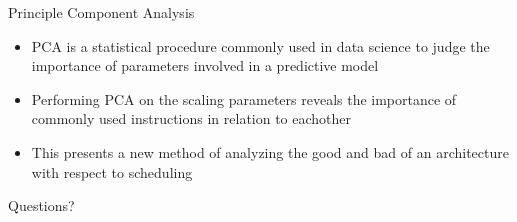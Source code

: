 \documentclass{beamer}
\begin{document}
\begin{darkframes}
    \begin{frame}{Principle Component Analysis}

      \begin{itemize}
        \item PCA is a statistical procedure commonly used  in data
          science to \alert{judge the importance of parameters} involved
          in a \alert{ predictive model}
        \item Performing PCA on the scaling parameters reveals the
          importance of commonly used instructions in relation to eachother
        \item This presents a new method of \alert{ analyzing the
            good and bad} of an architecture with respect to scheduling
      \end{itemize}
    \end{frame}
    
    \begin{frame}{Questions?}
      
    \end{frame}
    
  \end{darkframes}
\end{document}
